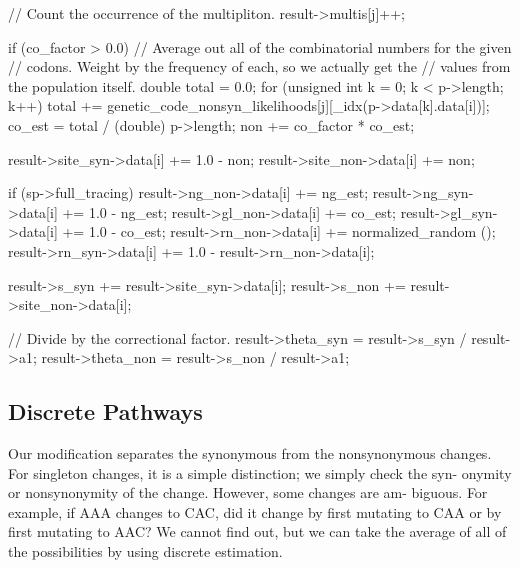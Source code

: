 \documentclass{article}
\begin{document}
\begin{ccode}
{{{{	 // Count the occurrence of the multipliton.
	 result->multis[j]++;

	 if (co_factor > 0.0) {
	   // Average out all of the combinatorial numbers for the given
	   // codons. Weight by the frequency of each, so we actually get the
	   // values from the population itself.
	   double total = 0.0;
	   for (unsigned int k = 0; k < p->length; k++)
	     total += genetic_code_nonsyn_likelihoods[j][_idx(p->data[k].data[i])];
	   co_est = total / (double) p->length;
	   non += co_factor * co_est;
	 }

	 result->site_syn->data[i] += 1.0 - non;
	 result->site_non->data[i] += non;

	 if (sp->full_tracing) {
	   result->ng_non->data[i]  += ng_est;
	   result->ng_syn->data[i]  += 1.0 - ng_est;
	   result->gl_non->data[i]  += co_est;
	   result->gl_syn->data[i]  += 1.0 - co_est;
	   result->rn_non->data[i]  += normalized_random ();
	   result->rn_syn->data[i]  += 1.0 - result->rn_non->data[i];
	 }
       }
    }
    
    result->s_syn += result->site_syn->data[i];
    result->s_non += result->site_non->data[i];
  }

  // Divide by the correctional factor.
  result->theta_syn = result->s_syn / result->a1;
  result->theta_non = result->s_non / result->a1;
}
\end{ccode}

    \subsection{Discrete Pathways}
      \label{sec:pathways}

      Our modification separates the synonymous from the nonsynonymous changes.
      For singleton changes, it is a simple distinction; we simply check the
      syn- onymity or nonsynonymity of the change. However, some changes are am-
      biguous. For example, if AAA changes to CAC, did it change by first
      mutating to CAA or by first mutating to AAC? We cannot find out, but we
      can take the average of all of the possibilities by using discrete
      estimation.
\end{document}
